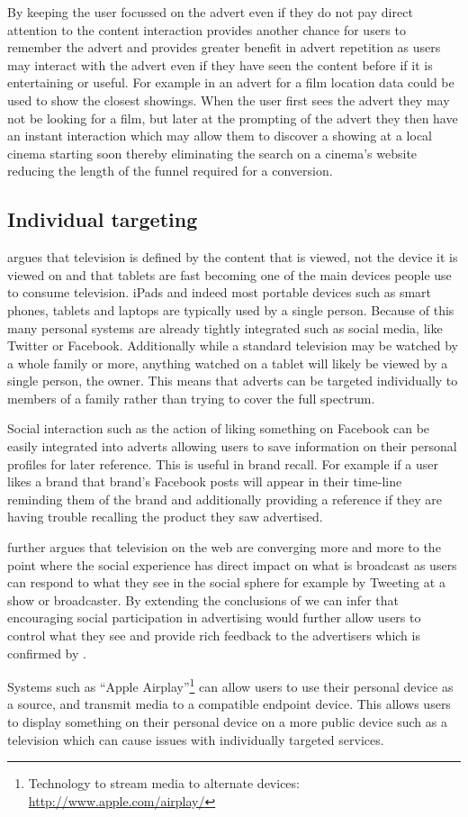 	By keeping the user focussed on the advert even if they do not pay direct attention to the content interaction provides another chance for users to remember the advert and provides greater benefit in advert repetition as users may interact with the advert even if they have seen the content before if it is entertaining or useful. For example in an advert for a film location data could be used to show the closest showings. When the user first sees the advert they may not be looking for a film, but later at the prompting of the advert they then have an instant interaction which may allow them to discover a showing at a local cinema starting soon thereby eliminating the search on a cinema's website reducing the length of the funnel required for a conversion.

\subsection{Individual targeting}
	\citep{socialTVPaper} argues that television is defined by the content that is viewed, not the device it is viewed on and that tablets are fast becoming one of the main devices people use to consume television. iPads and indeed most portable devices such as smart phones, tablets and laptops are typically used by a single person. Because of this many personal systems are already tightly integrated such as social media, like Twitter or Facebook. Additionally while a standard television may be watched by a whole family or more, anything watched on a tablet will likely be viewed by a single person, the owner. This means that adverts can be targeted individually to members of a family rather than trying to cover the full spectrum.

	Social interaction such as the action of liking something on Facebook can be easily integrated into adverts allowing users to save information on their personal profiles for later reference. This is useful in brand recall. For example if a user likes a brand that brand's Facebook posts will appear in their time-line reminding them of the brand and additionally providing a reference if they are having trouble recalling the product they saw advertised.

	\citep{socialTVPaper} further argues that television on the web are converging more and more to the point where the social experience has direct impact on what is broadcast as users can respond to what they see in the social sphere for example by Tweeting at a show or broadcaster. By extending the conclusions of \citep{socialTVPaper} we can infer that encouraging social participation in advertising would further allow users to control what they see and provide rich feedback to the advertisers which is confirmed by \citep{socialTV}.

	Systems such as ``Apple Airplay''\footnote{Technology to stream media to alternate devices: \url{http://www.apple.com/airplay/}} can allow users to use their personal device as a source, and transmit media to a compatible endpoint device. This allows users to display something on their personal device on a more public device such as a television which can cause issues with individually targeted services.